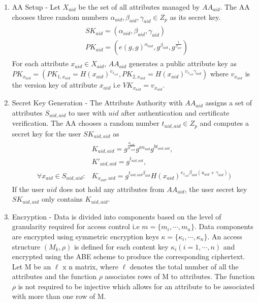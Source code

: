 \begin{enumerate}
\begin{enumerate}
	\end{enumerate}
	
	\item AA Setup - Let $ X_{aid} $ be the set of all attributes managed by $ AA_{aid} $. The AA chooses three random numbers $ \alpha_{aid}, \beta_{aid}, \gamma_{aid} \in Z_{p} $ as its secret key.
	\begin{align}
	\begin{split}
	&SK_{aid} = (\alpha_{aid}, \beta_{aid}, \gamma_{aid}) \\
	&PK_{aid} = (e(g, g)^{\alpha_{aid}}, g^{\beta_{aid}}, g^{\frac{1}{\beta_{aid}}})
	\end{split}
	\end{align}
	For each attribute $ x_{aid} \in X_{aid} $, $ AA_{aid} $ generates a public attribute key as $ PK_{x_{aid}} = (PK_{1, x_{aid}} = H(x_{aid})^{v_{x_{aid}}}, PK_{2, x_{aid}} = H(x_{aid})^{v_{x_{aid}}\gamma_{aid}}) $ where $ v_{x_{aid}} $ is the version key of attribute $ x_{aid} $ i.e $ VK_{x_{aid}} = v_{x_{aid}} $.
	
	\item Secret Key Generation - The Attribute Authority with $ AA_{aid} $ assigns a set of attributes $ S_{uid,aid} $ to user with $ uid $ after authentication and certificate verification. The AA chooses a random number $ t_{uid,aid} \in Z_{p} $ and computes a secret key for the user $SK_{uid,aid}$ as
	\begin{align}
	\begin{split}
	&K_{uid,aid} = g^{\frac{\alpha_{aid}}{u'_{uid}}}g^{au_{uid}}g^{bt_{uid,aid}},\\ &K'_{uid,aid} = g^{t_{uid,aid}}, \\
	\forall x_{aid} \in S_{uid,aid} \colon &K_{x_{aid},uid} = g^{t_{uid,aid}\beta_{aid}}H(x_{aid})^{v_{x_{aid}}\beta_{aid}(u_{uid} + \gamma_{aid})})
	\end{split}
	\end{align}
	If the user $ uid $ does not hold any attributes from $ AA_{aid} $, the user secret key $ SK_{uid,aid} $ only contains $ K_{uid,aid} $.
	
	\item Encryption - Data is divided into components based on the level of granularity required for access control i.e $ m = \{m_{i}, \cdots, m_{n}\} $. Data components are encrypted using symmetric encryption keys $ \kappa = \{\kappa_{i}, \cdots, \kappa_{n}\} $. An access structure $ (M_{k}, \rho) $ is defined for each content key $ \kappa_{i} (i = 1, \cdots, n) $ and encrypted using the ABE scheme to produce the corresponding ciphertext. Let M be an $\ell$ x n matrix, where $\ell$ denotes the total number of all the attributes and the function $ \rho $ associates rows of M to attributes. The function $\rho$ is not required to be injective which allows for an attribute to be associated with more than one row of M.
	

\end{enumerate}
